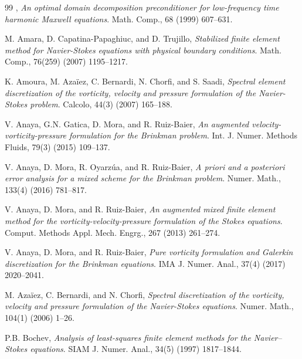 \documentclass[reqno,a4paper]{article}
\numberwithin{equation}{section}
\begin{document}
\begin{thebibliography}{99}
\small 
 , {\it An optimal
    domain decomposition preconditioner for low-frequency time
    harmonic Maxwell equations}.  Math. Comp., 68 (1999) 607--631.

 {\sc M. Amara, D. Capatina-Papaghiuc, and
  D. Trujillo}, {\it Stabilized finite element method for
  Navier-Stokes equations with physical boundary conditions}.
  Math. Comp., 76(259) (2007) 1195--1217.
    
 {\sc K. Amoura,  M. Aza\"iez, C. Bernardi, N. Chorfi, and S. Saadi}, 
{\it Spectral element discretization of the vorticity, velocity and pressure
 formulation of the Navier-Stokes problem}.
Calcolo, 44(3) (2007) 165--188. 


 {\sc V. Anaya, G.N. Gatica, D. Mora, and R. Ruiz-Baier},
{\it An augmented velocity-vorticity-pressure formulation for the Brinkman problem}.
  Int. J. Numer. Methods Fluids, 79(3) (2015) 109--137.

 {\sc V. Anaya, D. Mora, R. Oyarz\'ua, and
  R. Ruiz-Baier}, {\it A priori and a posteriori error
  analysis for a mixed scheme for the Brinkman problem}.
  Numer. Math., 133(4) (2016) 781--817.

 {\sc V. Anaya, D. Mora, and R. Ruiz-Baier}, {\it
    An augmented mixed finite element method for the
    vorticity-velocity-pressure formulation of the Stokes equations}.
    Comput. Methods Appl. Mech. Engrg., 267 (2013) 261--274.

 {\sc V. Anaya, D. Mora, and R. Ruiz-Baier},
{\it Pure vorticity formulation and Galerkin discretization for the 
Brinkman equations}. IMA J. Numer. Anal., 37(4) (2017) 2020--2041. 
 
 {\sc  M. Aza\"iez, C. Bernardi, and N. Chorfi}, 
{\it Spectral discretization of the vorticity, velocity and pressure
formulation of the Navier-Stokes equations}.
Numer. Math., 104(1) (2006) 1--26. 

 {\sc P.B. Bochev}, {\it Analysis of least-squares
  finite element methods for the Navier--Stokes equations}. SIAM
  J. Numer. Anal., 34(5) (1997) 1817--1844.
  

\end{thebibliography}
\end{document}
